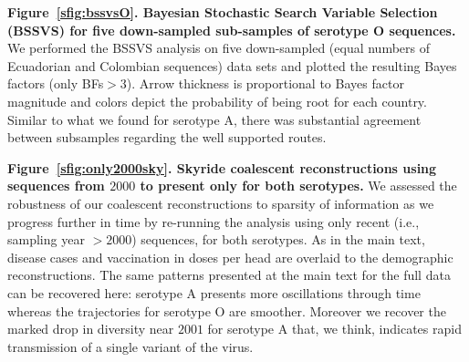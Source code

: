 \documentclass[a4paper,10pt]{article}
\begin{document}
\textbf{Figure~\ref{sfig:bssvsO}. Bayesian Stochastic Search Variable Selection (BSSVS) for five down-sampled sub-samples of serotype O sequences.}
We performed the BSSVS analysis on five down-sampled (equal numbers of Ecuadorian and Colombian sequences) data sets and  plotted the resulting Bayes factors (only BFs$>3$).
Arrow thickness is proportional to Bayes factor magnitude and colors depict the probability of being root for each country.
Similar to what we found for serotype A, there was substantial agreement between subsamples regarding the well supported routes.

\textbf{Figure~\ref{sfig:only2000sky}. Skyride coalescent reconstructions using sequences from $2000$ to present only for both serotypes.}
We assessed the robustness of our coalescent reconstructions to sparsity of information as we progress further in time by re-running the analysis using only recent (i.e., sampling year $>2000$) sequences, for both serotypes.
As in the main text, disease cases and vaccination in doses per head are overlaid to the demographic reconstructions.
The same patterns presented at the main text for the full data can be recovered here: serotype A presents more oscillations through time whereas the trajectories for serotype O are smoother.
Moreover we recover the marked drop in diversity near $2001$ for serotype A that, we think, indicates rapid transmission of a single variant of the virus.
\end{document}
